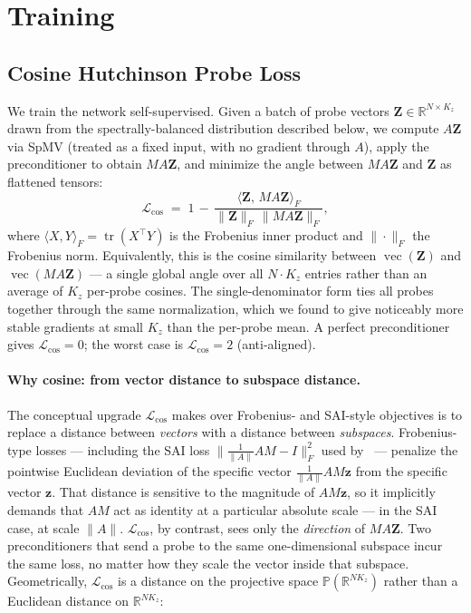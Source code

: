 \documentclass[acmtog]{acmart}
\theoremstyle{plain}
\begin{document}
\section{Training}
\label{sec:training}

\subsection{Cosine Hutchinson Probe Loss}
\label{sec:training:loss}

We train the network self-supervised. Given a batch of probe vectors
$\mathbf{Z}\in\mathbb{R}^{N\times K_z}$ drawn from the spectrally-balanced distribution
described below, we compute $A\mathbf{Z}$ via SpMV (treated as a fixed input, with no
gradient through $A$), apply the preconditioner to obtain $MA\mathbf{Z}$, and minimize the
angle between $MA\mathbf{Z}$ and $\mathbf{Z}$ as flattened tensors:
\begin{equation}
  \mathcal{L}_{\cos}
  \;=\; 1 \,-\, \frac{\langle \mathbf{Z},\,MA\mathbf{Z}\rangle_F}
        {\|\mathbf{Z}\|_F\,\|MA\mathbf{Z}\|_F},
  \label{eq:loss}
\end{equation}
where $\langle X,Y\rangle_F = \operatorname{tr}(X^\top Y)$ is the Frobenius inner product and
$\|\!\cdot\!\|_F$ the Frobenius norm. Equivalently, this is the cosine similarity between
$\operatorname{vec}(\mathbf{Z})$ and $\operatorname{vec}(MA\mathbf{Z})$ --- a single global
angle over all $N\!\cdot\!K_z$ entries rather than an average of $K_z$ per-probe cosines.
The single-denominator form ties all probes together through the same normalization, which
we found to give noticeably more stable gradients at small $K_z$ than the per-probe mean.
A perfect preconditioner gives $\mathcal{L}_{\cos}\!=\!0$; the worst case is
$\mathcal{L}_{\cos}\!=\!2$ (anti-aligned).

\paragraph{Why cosine: from vector distance to subspace distance.}
The conceptual upgrade $\mathcal{L}_{\cos}$ makes over Frobenius- and SAI-style objectives
is to replace a distance between \emph{vectors} with a distance between \emph{subspaces}.
Frobenius-type losses --- including the SAI loss
$\bigl\|\tfrac{1}{\|A\|}AM-I\bigr\|_F^2$ used by~\cite{Yang2025sparse} --- penalize the
pointwise Euclidean deviation of the specific vector $\tfrac{1}{\|A\|}AM\mathbf{z}$ from the
specific vector $\mathbf{z}$. That distance is sensitive to the magnitude of $AM\mathbf{z}$,
so it implicitly demands that $AM$ act as identity at a particular absolute scale --- in the
SAI case, at scale $\|A\|$. $\mathcal{L}_{\cos}$, by contrast, sees only the
\emph{direction} of $MA\mathbf{Z}$. Two preconditioners that send a probe to the same
one-dimensional subspace incur the same loss, no matter how they scale the vector inside
that subspace. Geometrically, $\mathcal{L}_{\cos}$ is a distance on the projective space
$\mathbb{P}(\mathbb{R}^{NK_z})$ rather than a Euclidean distance on $\mathbb{R}^{NK_z}$:
\end{document}
